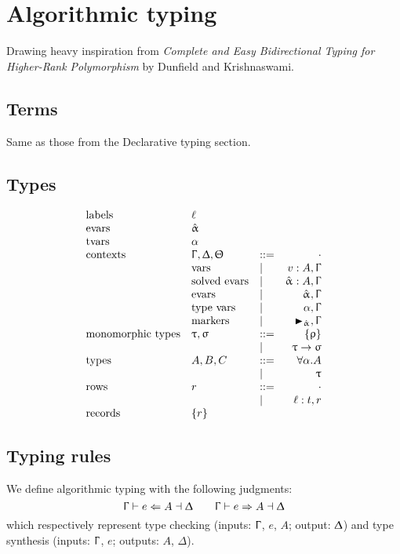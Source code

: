 \documentclass{article}
\newcommand{\define}{::=}
\newcommand{\arrow}{\to}
\newcommand{\rcd}[1]{\{#1\}}
\newcommand{\emptyrow}{\cdot}
\newcommand{\spc}{\qquad}
\newcommand{\ctx}{\Upgamma}
\newcommand{\ctxalt}{\Updelta}
\newcommand{\ctxaltt}{\Uptheta}
\newcommand{\lbl}{\ell}
\newcommand{\expr}{e}
\newcommand{\var}{v}
\newcommand{\row}{r}
\newcommand{\tp}{A}
\newcommand{\tpalt}{B}
\newcommand{\tpaltt}{C}
\newcommand{\marker}[1]{\RHD_{#1}}
\newcommand{\ev}{\hat}
\newcommand{\evar}[1][]{\ev \upalpha_{#1}}
\newcommand{\tvar}{\alpha}
\newcommand{\ctxinout}[3]{#1 \vdash #2 \dashv #3}
\newcommand{\synth}[4]{\ctxinout {#1} {#2 \Rightarrow #3} {#4}}
\renewcommand{\check}[4]{\ctxinout {#1} {#2 \Leftarrow #3} {#4}}
\begin{document}
\section{Algorithmic typing}

Drawing heavy inspiration from \textit{Complete and Easy Bidirectional Typing
  for Higher-Rank Polymorphism} by Dunfield and Krishnaswami.

\subsection{Terms}

Same as those from the Declarative typing section.

\subsection{Types}

\[
  \begin{array}{lllrl}
    \text{labels} & \lbl & & \\
    \text{evars} & \evar & & \\
    \text{tvars} & \tvar & & \\
    \text{contexts} & \ctx, \ctxalt, \ctxaltt & \define & \cdot \\
    & \text{vars} & | & \var : \tp, \ctx \\
    & \text{solved evars} & | & \evar : \tp, \ctx \\
    & \text{evars} & | & \evar, \ctx \\
    & \text{type vars} & | & \tvar, \ctx \\
    & \text{markers} & | & \marker \evar, \ctx \\
    \text{monomorphic types} & \uptau, \upsigma & \define & \rcd \uprho  \\
    & & | & \uptau \arrow \upsigma \\
    \text{types} & \tp, \tpalt, \tpaltt & \define & \forall \tvar . \tp \\
    & & | & \uptau \\
    \text{rows} & \row & \define & \emptyrow  \\
    & & | & \lbl : t, \row \\
    \text{records} & \{\row\} & &
  \end{array}
\]

\subsection{Typing rules}
We define algorithmic typing with the following judgments:
\[
\check{\ctx}{e}{A}{\ctxalt}
\spc
\synth{\ctx}{e}{A}{\ctxalt}
\]
which respectively represent type checking (inputs: $\ctx$, $\expr$, $A$; output: $\ctxalt$) and type synthesis (inputs: $\ctx$, $\expr$; outputs: $A$, $\Delta$).
\end{document}
